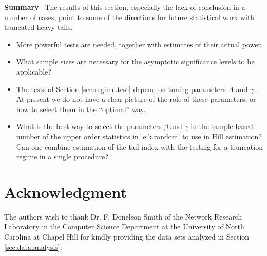 \documentclass[11pt]{amsart}
\numberwithin{equation}{section}
\begin{document}
{\bf Summary} \ The results of this section, especially the lack of
conclusion in a number of cases, point to some of the
directions  for future statistical work with truncated heavy tails.
\begin{itemize}
\item More powerful tests are needed, together with estimates of their 
actual power. 
\item What sample sizes are necessary for the asymptotic
significance levels to be applicable?
\item The tests of Section \ref{sec:regime.test} depend on tuning
parameters $A$ and $\gamma$. At present we do not have a clear picture
of the role of these parameters, or how to select them in the 
``optimal'' way. 
\item What is the best way to select the parameters $\beta$ and
$\gamma$ in the sample-based number of the upper order statistics in
\eqref{e:k.random} to use in Hill estimation? Can one combine
estimation of the tail index with the testing for a truncation regime
in a single procedure?
\end{itemize}

\section{Acknowledgment} The authors wish to thank Dr. F. Donelson
Smith of the Network Research Laboratory in the Computer Science
Department at the University of North Carolina at Chapel Hill for kindly
providing the data sets analyzed in Section
\ref{sec:data.analysis}.



\end{document}
